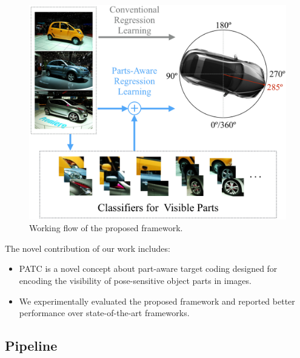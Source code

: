\documentclass{tutmscthesis}[2010/09/22]
\numberwithin{equation}{section}
\numberwithin{table}{section}
\numberwithin{figure}{section}
\begin{document}
\begin{figure}[h]
\centering
\includegraphics[width=0.9\linewidth]{workingflow.png}
\caption{Working flow of the proposed framework.}
\label{fig:workflow} 
\end{figure}

\clearpage

The novel contribution of our work includes:
\begin{itemize}
\item PATC is a novel concept about part-aware target coding designed for encoding the visibility of pose-sensitive object parts in images.
\item We experimentally evaluated the proposed framework and reported better performance over state-of-the-art frameworks.
\end{itemize}



\subsection{Pipeline}
\end{document}
